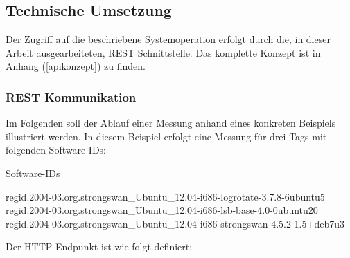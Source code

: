 \subsection{Technische Umsetzung}
Der Zugriff auf die beschriebene Systemoperation erfolgt durch die, in dieser
Arbeit ausgearbeiteten, REST Schnittstelle. Das komplette Konzept ist in
Anhang (\autoref{apikonzept}) zu finden.

\subsubsection{REST Kommunikation}
Im Folgenden soll der Ablauf einer Messung anhand eines konkreten Beispiels
illustriert werden. In diesem Beispiel erfolgt eine Messung für drei Tags mit
folgenden Software-IDs:

\begin{listing}[H]
\caption{Software-IDs}
\begin{textcode}
regid.2004-03.org.strongswan_Ubuntu_12.04-i686-logrotate-3.7.8-6ubuntu5
regid.2004-03.org.strongswan_Ubuntu_12.04-i686-lsb-base-4.0-0ubuntu20
regid.2004-03.org.strongswan_Ubuntu_12.04-i686-strongswan-4.5.2-1.5+deb7u3
\end{textcode}
\end{listing}

Der HTTP Endpunkt ist wie folgt definiert:

